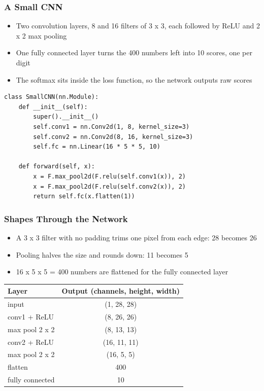 \begin{frame}[fragile]\frametitle{A Small CNN}
\begin{itemize}
\item Two convolution layers, 8 and 16 filters of 3 x 3, each followed by ReLU and 2 x 2 max pooling
\item One fully connected layer turns the 400 numbers left into 10 scores, one per digit
\item The softmax sits inside the loss function, so the network outputs raw scores
\end{itemize}
\begin{lstlisting}
class SmallCNN(nn.Module):
    def __init__(self):
        super().__init__()
        self.conv1 = nn.Conv2d(1, 8, kernel_size=3)
        self.conv2 = nn.Conv2d(8, 16, kernel_size=3)
        self.fc = nn.Linear(16 * 5 * 5, 10)

    def forward(self, x):
        x = F.max_pool2d(F.relu(self.conv1(x)), 2)
        x = F.max_pool2d(F.relu(self.conv2(x)), 2)
        return self.fc(x.flatten(1))
\end{lstlisting}
\end{frame}

\begin{frame}[fragile]\frametitle{Shapes Through the Network}
\begin{itemize}
\item A 3 x 3 filter with no padding trims one pixel from each edge: 28 becomes 26
\item Pooling halves the size and rounds down: 11 becomes 5
\item 16 x 5 x 5 = 400 numbers are flattened for the fully connected layer
\end{itemize}
\begin{center}
\small
\begin{tabular}{lc}
\hline
Layer & Output (channels, height, width) \\
\hline
input & (1, 28, 28) \\
conv1 + ReLU & (8, 26, 26) \\
max pool 2 x 2 & (8, 13, 13) \\
conv2 + ReLU & (16, 11, 11) \\
max pool 2 x 2 & (16, 5, 5) \\
flatten & 400 \\
fully connected & 10 \\
\hline
\end{tabular}
\end{center}
\end{frame}

